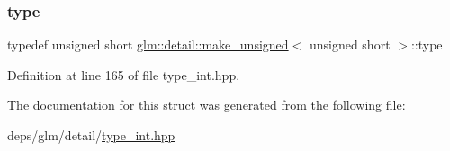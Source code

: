 \subsubsection{\texorpdfstring{type}{type}}
{\footnotesize\ttfamily typedef unsigned short \hyperlink{structglm_1_1detail_1_1make__unsigned}{glm\+::detail\+::make\+\_\+unsigned}$<$ unsigned short $>$\+::type}



Definition at line 165 of file type\+\_\+int.\+hpp.



The documentation for this struct was generated from the following file\+:\begin{DoxyCompactItemize}
\item 
deps/glm/detail/\hyperlink{type__int_8hpp}{type\+\_\+int.\+hpp}\end{DoxyCompactItemize}
